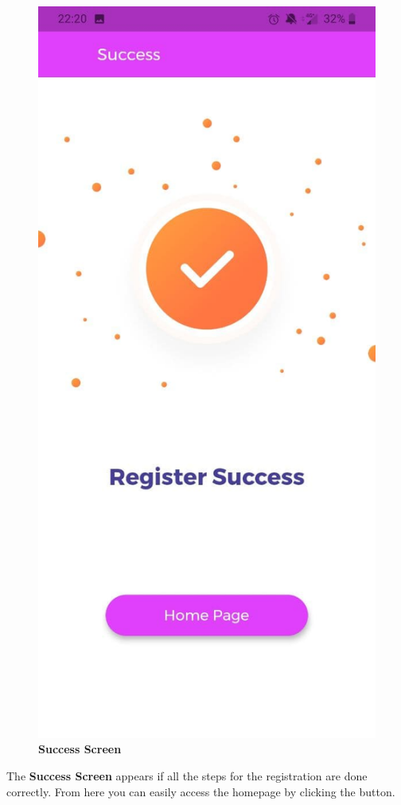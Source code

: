 \documentclass[../../dd.tex]{subfiles}
\begin{document}
    \begin{figure}[H]
        \centering
        \includegraphics[height=.6\textheight]{../../assets/screens/success.jpg}
        \caption{\textbf{Success Screen}}\label{fig:figure}
    \end{figure}
    \begin{center}
        The \textbf{Success Screen} appears if all the steps for the registration are done correctly.
        From here you can easily access the homepage by clicking the button.
    \end{center}
\end{document}
